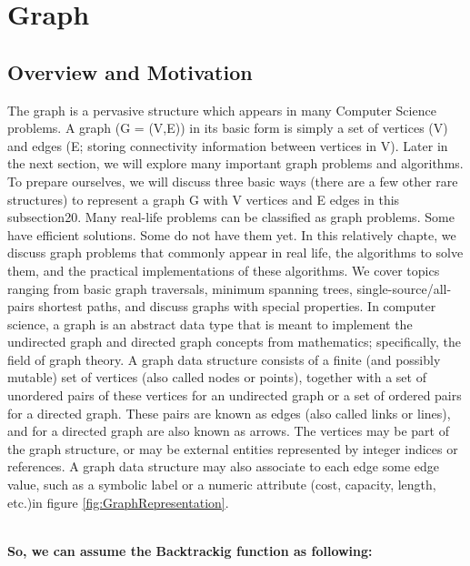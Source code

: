 \chapter{Graph}

\section{Overview and Motivation} 
\label{sec:s1}
The graph is a pervasive structure which appears in many Computer Science problems. A graph (G = (V,E)) in its basic form is simply a set of vertices (V) and edges (E; storing connectivity information between vertices in V). Later in the next section, we will explore many important graph problems and algorithms. To prepare ourselves, we will discuss three basic ways (there are a few other rare structures) to represent a graph G with V vertices and E edges in this subsection20. Many real-life problems can be classified as graph problems. Some have efficient solutions. Some do not have them yet. In this relatively chapte, we discuss graph problems that commonly appear in real life, the algorithms to solve them, and the practical implementations of these algorithms. We cover topics ranging from basic graph traversals, minimum spanning trees, single-source/all-pairs shortest paths, and discuss graphs with special properties. In computer science, a graph is an abstract data type that is meant to implement the undirected graph and directed graph concepts from mathematics; specifically, the field of graph theory. A graph data structure consists of a finite (and possibly mutable) set of vertices (also called nodes or points), together with a set of unordered pairs of these vertices for an undirected graph or a set of ordered pairs for a directed graph. These pairs are known as edges (also called links or lines), and for a directed graph are also known as arrows. The vertices may be part of the graph structure, or may be external entities represented by integer indices or references. A graph data structure may also associate to each edge some edge value, such as a symbolic label or a numeric attribute (cost, capacity, length, etc.)in figure \ref{fig:GraphRepresentation}.
\newpage

\\
\newline
\textbf{{\Large{So, we can assume the Backtrackig function as following:}}}


